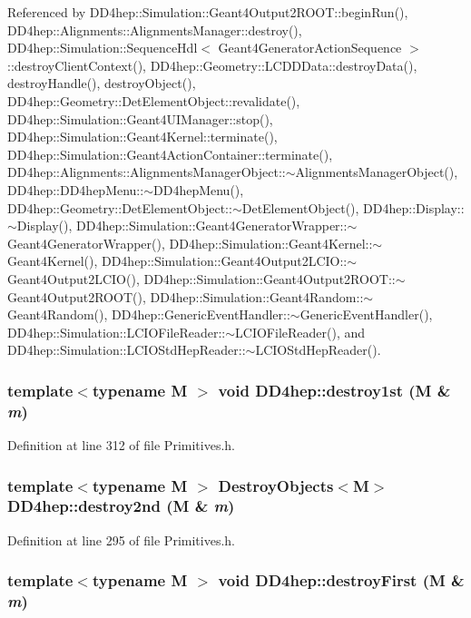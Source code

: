 Referenced by DD4hep::Simulation::Geant4Output2ROOT::beginRun(), DD4hep::Alignments::AlignmentsManager::destroy(), DD4hep::Simulation::SequenceHdl$<$ Geant4GeneratorActionSequence $>$::destroyClientContext(), DD4hep::Geometry::LCDDData::destroyData(), destroyHandle(), destroyObject(), DD4hep::Geometry::DetElementObject::revalidate(), DD4hep::Simulation::Geant4UIManager::stop(), DD4hep::Simulation::Geant4Kernel::terminate(), DD4hep::Simulation::Geant4ActionContainer::terminate(), DD4hep::Alignments::AlignmentsManagerObject::$\sim$AlignmentsManagerObject(), DD4hep::DD4hepMenu::$\sim$DD4hepMenu(), DD4hep::Geometry::DetElementObject::$\sim$DetElementObject(), DD4hep::Display::$\sim$Display(), DD4hep::Simulation::Geant4GeneratorWrapper::$\sim$Geant4GeneratorWrapper(), DD4hep::Simulation::Geant4Kernel::$\sim$Geant4Kernel(), DD4hep::Simulation::Geant4Output2LCIO::$\sim$Geant4Output2LCIO(), DD4hep::Simulation::Geant4Output2ROOT::$\sim$Geant4Output2ROOT(), DD4hep::Simulation::Geant4Random::$\sim$Geant4Random(), DD4hep::GenericEventHandler::$\sim$GenericEventHandler(), DD4hep::Simulation::LCIOFileReader::$\sim$LCIOFileReader(), and DD4hep::Simulation::LCIOStdHepReader::$\sim$LCIOStdHepReader().\hypertarget{namespace_d_d4hep_abc92ec3a17763a2b4cf06ab0ce96d803}{
\subsubsection[{destroy1st}]{\setlength{\rightskip}{0pt plus 5cm}template$<$typename M $>$ void DD4hep::destroy1st (M \& {\em m})}}
\label{namespace_d_d4hep_abc92ec3a17763a2b4cf06ab0ce96d803}


Definition at line 312 of file Primitives.h.\hypertarget{namespace_d_d4hep_ab064c9ee174e787548e74ba743d9fb77}{
\subsubsection[{destroy2nd}]{\setlength{\rightskip}{0pt plus 5cm}template$<$typename M $>$ {\bf DestroyObjects}$<$M$>$ DD4hep::destroy2nd (M \& {\em m})}}
\label{namespace_d_d4hep_ab064c9ee174e787548e74ba743d9fb77}


Definition at line 295 of file Primitives.h.\hypertarget{namespace_d_d4hep_af45dd8d71ae6623d0023b837a0108aac}{
\subsubsection[{destroyFirst}]{\setlength{\rightskip}{0pt plus 5cm}template$<$typename M $>$ void DD4hep::destroyFirst (M \& {\em m})}}
\label{namespace_d_d4hep_af45dd8d71ae6623d0023b837a0108aac}


